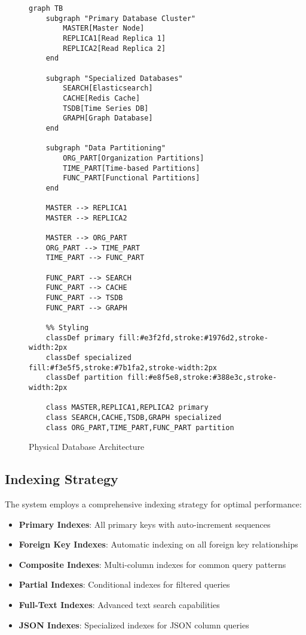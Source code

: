 \documentclass[12pt,a4paper]{article}
\begin{document}
\begin{figure}[H]
\centering
\begin{verbatim}
graph TB
    subgraph "Primary Database Cluster"
        MASTER[Master Node]
        REPLICA1[Read Replica 1]
        REPLICA2[Read Replica 2]
    end
    
    subgraph "Specialized Databases"
        SEARCH[Elasticsearch]
        CACHE[Redis Cache]
        TSDB[Time Series DB]
        GRAPH[Graph Database]
    end
    
    subgraph "Data Partitioning"
        ORG_PART[Organization Partitions]
        TIME_PART[Time-based Partitions]
        FUNC_PART[Functional Partitions]
    end
    
    MASTER --> REPLICA1
    MASTER --> REPLICA2
    
    MASTER --> ORG_PART
    ORG_PART --> TIME_PART
    TIME_PART --> FUNC_PART
    
    FUNC_PART --> SEARCH
    FUNC_PART --> CACHE
    FUNC_PART --> TSDB
    FUNC_PART --> GRAPH
    
    %% Styling
    classDef primary fill:#e3f2fd,stroke:#1976d2,stroke-width:2px
    classDef specialized fill:#f3e5f5,stroke:#7b1fa2,stroke-width:2px
    classDef partition fill:#e8f5e8,stroke:#388e3c,stroke-width:2px
    
    class MASTER,REPLICA1,REPLICA2 primary
    class SEARCH,CACHE,TSDB,GRAPH specialized
    class ORG_PART,TIME_PART,FUNC_PART partition
\end{verbatim}
\caption{Physical Database Architecture}
\end{figure}

\subsection{Indexing Strategy}

The system employs a comprehensive indexing strategy for optimal performance:

\begin{itemize}
    \item \textbf{Primary Indexes}: All primary keys with auto-increment sequences
    \item \textbf{Foreign Key Indexes}: Automatic indexing on all foreign key relationships
    \item \textbf{Composite Indexes}: Multi-column indexes for common query patterns
    \item \textbf{Partial Indexes}: Conditional indexes for filtered queries
    \item \textbf{Full-Text Indexes}: Advanced text search capabilities
    \item \textbf{JSON Indexes}: Specialized indexes for JSON column queries
\end{itemize}
\end{document}

